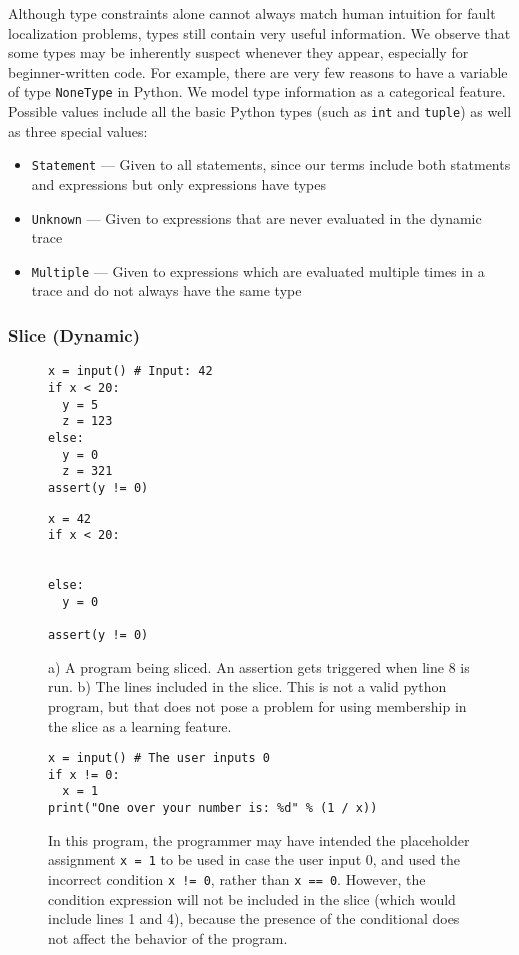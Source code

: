 \documentclass[conference]{IEEEtran}
\newcommand\lt[1]{{\lstinline|#1|}}
\begin{document}
Although type constraints alone cannot always match human intuition for
fault localization problems, types still contain very useful information.
We observe that some types may be inherently suspect whenever they appear,
especially for beginner-written code. For example, there are very few
reasons to have a variable of type \lt{NoneType} in Python. We model
type information as a categorical feature. Possible
values include all the basic Python types (such as \lt{int}
and \lt{tuple}) as well as three special values:
\begin{itemize}
    \item \lt{Statement} --- Given to all statements, since our terms
    include both statments and expressions but only expressions
    have types
    \item \lt{Unknown} --- Given to expressions that are never evaluated in the dynamic
    trace
    \item \lt{Multiple} --- Given to expressions which are evaluated multiple times in
    a trace and do not always have the same type
\end{itemize}

\subsubsection{Slice (Dynamic)}

\begin{figure}
\begin{lstlisting}
x = input() # Input: 42
if x < 20:
  y = 5
  z = 123
else:
  y = 0
  z = 321
assert(y != 0)
\end{lstlisting}
\begin{lstlisting}
x = 42
if x < 20:


else:
  y = 0

assert(y != 0)
\end{lstlisting}
\caption{
  a) A program being sliced. An assertion gets triggered when line 8 is run. b)
  The lines included in the slice. This is not a valid python
  program, but that does not pose a problem for using membership in the slice as
  a learning feature.
}
\label{fig-slice-example}
\end{figure}

\begin{figure}
\begin{lstlisting}
x = input() # The user inputs 0
if x != 0:
  x = 1
print("One over your number is: %d" % (1 / x))
\end{lstlisting}
\caption{In this program, the programmer may have intended the placeholder
  assignment \lt{x = 1} to be used in case the user input 0, and used the
  incorrect condition \lt{x != 0}, rather than \lt{x == 0}. However, the
  condition expression will not be included in the slice (which would include
  lines 1 and 4), because the presence of
  the conditional does not affect the behavior of the program.
}
\label{fig-slice-downside-example}
\end{figure}
\end{document}
